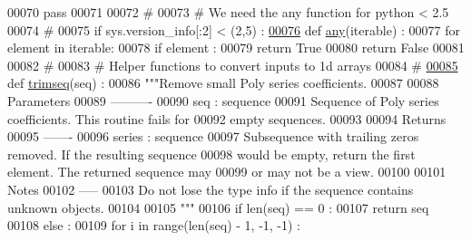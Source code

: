 \begin{DoxyCode}
00070     \textcolor{keywordflow}{pass}
00071 
00072 \textcolor{comment}{#}
00073 \textcolor{comment}{# We need the any function for python < 2.5}
00074 \textcolor{comment}{#}
00075 \textcolor{keywordflow}{if} sys.version\_info[:2] < (2,5) :
\hypertarget{polyutils_8py_source_l00076}{}\hyperlink{namespacepyneb_1_1utils_1_1polyutils_a7a16ae5631115dce0a513eaec3a06470}{00076}     \textcolor{keyword}{def }\hyperlink{namespacepyneb_1_1utils_1_1polyutils_a7a16ae5631115dce0a513eaec3a06470}{any}(iterable) :
00077         \textcolor{keywordflow}{for} element \textcolor{keywordflow}{in} iterable:
00078             \textcolor{keywordflow}{if} element :
00079                 \textcolor{keywordflow}{return} \textcolor{keyword}{True}
00080         \textcolor{keywordflow}{return} \textcolor{keyword}{False}
00081 
00082 \textcolor{comment}{#}
00083 \textcolor{comment}{# Helper functions to convert inputs to 1d arrays}
00084 \textcolor{comment}{#}
\hypertarget{polyutils_8py_source_l00085}{}\hyperlink{namespacepyneb_1_1utils_1_1polyutils_a2d09c123dbbcfd4623784cacf1fc945c}{00085} \textcolor{keyword}{def }\hyperlink{namespacepyneb_1_1utils_1_1polyutils_a2d09c123dbbcfd4623784cacf1fc945c}{trimseq}(seq) :
00086     \textcolor{stringliteral}{"""Remove small Poly series coefficients.}
00087 \textcolor{stringliteral}{}
00088 \textcolor{stringliteral}{    Parameters}
00089 \textcolor{stringliteral}{    ----------}
00090 \textcolor{stringliteral}{    seq : sequence}
00091 \textcolor{stringliteral}{        Sequence of Poly series coefficients. This routine fails for}
00092 \textcolor{stringliteral}{        empty sequences.}
00093 \textcolor{stringliteral}{}
00094 \textcolor{stringliteral}{    Returns}
00095 \textcolor{stringliteral}{    -------}
00096 \textcolor{stringliteral}{    series : sequence}
00097 \textcolor{stringliteral}{        Subsequence with trailing zeros removed. If the resulting sequence}
00098 \textcolor{stringliteral}{        would be empty, return the first element. The returned sequence may}
00099 \textcolor{stringliteral}{        or may not be a view.}
00100 \textcolor{stringliteral}{}
00101 \textcolor{stringliteral}{    Notes}
00102 \textcolor{stringliteral}{    -----}
00103 \textcolor{stringliteral}{    Do not lose the type info if the sequence contains unknown objects.}
00104 \textcolor{stringliteral}{}
00105 \textcolor{stringliteral}{    """}
00106     \textcolor{keywordflow}{if} len(seq) == 0 :
00107         \textcolor{keywordflow}{return} seq
00108     \textcolor{keywordflow}{else} :
00109         \textcolor{keywordflow}{for} i \textcolor{keywordflow}{in} range(len(seq) - 1, -1, -1) :

\end{DoxyCode}
